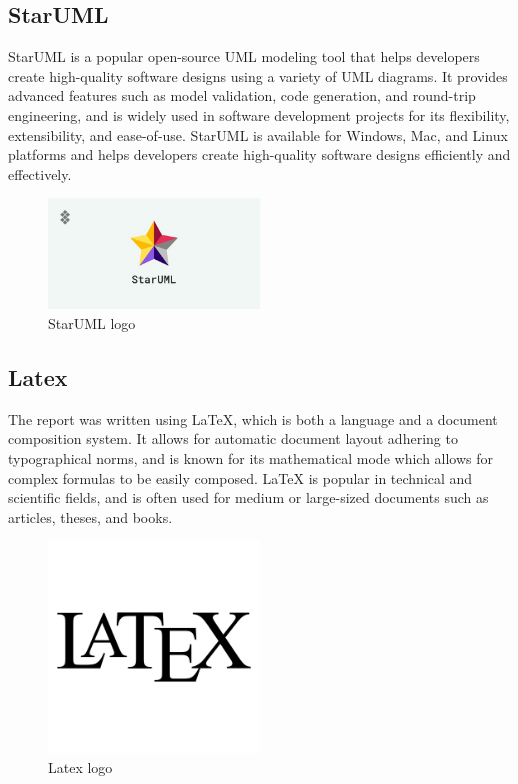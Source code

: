 \subsection{StarUML}
StarUML is a popular open-source UML modeling tool that helps developers create high-quality software designs using a variety of UML diagrams. It provides advanced features such as model validation, code generation, and round-trip engineering, and is widely used in software development projects for its flexibility, extensibility, and ease-of-use. StarUML is available for Windows, Mac, and Linux platforms and helps developers create high-quality software designs efficiently and effectively.
\begin{figure}[h]
    \centering
    \includegraphics[width=0.5\textwidth]{images/Ey8OGaPWUAAfrVX.jpg}
    \caption{StarUML logo}
    \label{fig:figure4}
\end{figure}


\subsection{Latex }
The report was written using LaTeX, which is both a language and a document composition system. It allows for automatic document layout adhering to typographical norms, and is known for its mathematical mode which allows for complex formulas to be easily composed. LaTeX is popular in technical and scientific fields, and is often used for medium or large-sized documents such as articles, theses, and books.
\begin{figure}[H]
    \centering
    \includegraphics[width=0.5\textwidth]{images/latex-logo-png-transparent.png}
    \caption{Latex logo}
    \label{fig:figure4}
\end{figure}

